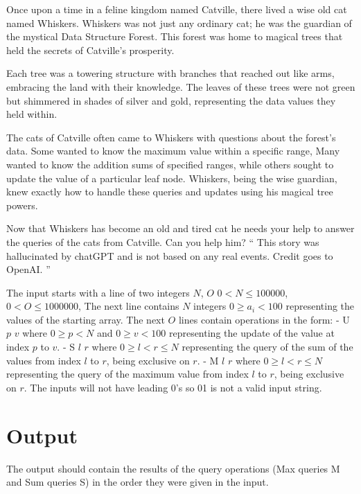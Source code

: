 

Once upon a time in a feline kingdom named Catville, there lived a wise old cat named Whiskers. Whiskers was not just any ordinary cat; he was the guardian of the mystical Data Structure Forest. This forest was home to magical trees that held the secrets of Catville's prosperity.

Each tree was a towering structure with branches that reached out like arms, embracing the land with their knowledge. The leaves of these trees were not green but shimmered in shades of silver and gold, representing the data values they held within.

The cats of Catville often came to Whiskers with questions about the forest's data. Some wanted to know the maximum value within a specific range, Many wanted to know the addition sums of specified ranges, while others sought to update the value of a particular leaf node. Whiskers, being the wise guardian, knew exactly how to handle these queries and updates using his magical tree powers.

Now that Whiskers has become an old and tired cat he needs your help to answer the queries of the cats from Catville. Can you help him?
`` This story was hallucinated by chatGPT and is not based on any real events. Credit goes to OpenAI. '' 

{\setlength{\parindent}{0cm}
}
\begin{Input}
The input starts with a line of two integers $N$, $O$
{\setlength{\parindent}{0cm}
$0 < N \leq 100 000$,
$0 < O \leq 1 000 000$, 
The next line contains $N$ integers $0 \geq a_i < 100$ representing the values of the starting array.  
The next $O$ lines contain operations in the form:
    - U $p$ $v$ where $0 \geq p < N$ and $0 \geq v < 100$ representing the update of the value at index $p$ to $v$.
    - S $l$ $r$ where $0 \geq l < r \leq N$ representing the query of the sum of the values from index $l$ to $r$, being exclusive on $r$.
    - M $l$ $r$ where $0 \geq l < r \leq N$ representing the query of the maximum value from index $l$ to $r$, being exclusive on $r$.
}
{\setlength{\parindent}{0cm}
The inputs will not have leading 0's so 01 is not a valid input string.
}
\end{Input}

\section*{Output}
The output should contain the results of the query operations (Max queries M and Sum queries S) in the order they were given in the input. 
{\setlength{\parindent}{0cm}
}
